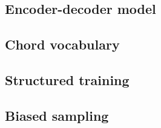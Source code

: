 \documentclass{article}
\begin{document}


\subsection{Encoder-decoder model}



\cite{ioffe2015batch}



\cite{chung2014empirical}



\subsection{Chord vocabulary}

%

\cite{raffel2014mir_eval}


\subsection{Structured training}



\cite{ni2012end} %
\cite{cho2014improved} %
\cite{korzeniowski2016feature} %

\subsection{Biased sampling}
\end{document}
